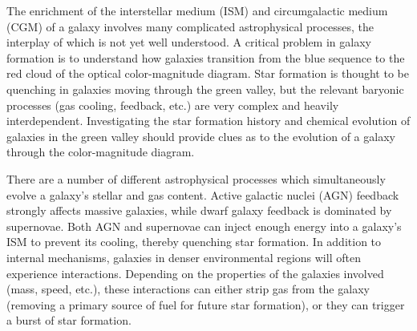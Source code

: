 The enrichment of the interstellar medium (ISM) and circumgalactic medium (CGM) 
of a galaxy involves many complicated astrophysical processes, the interplay of 
which is not yet well understood.  A critical problem in galaxy formation is to 
understand how galaxies transition from the blue sequence to the red cloud of 
the optical color-magnitude diagram.  Star formation is thought to be quenching 
in galaxies moving through the green valley, but the relevant baryonic processes 
(gas cooling, feedback, etc.) are very complex and heavily interdependent.  
Investigating the star formation history and chemical evolution of galaxies in 
the green valley should provide clues as to the evolution of a galaxy through 
the color-magnitude diagram.


There are a number of different astrophysical processes which simultaneously 
evolve a galaxy's stellar and gas content.  Active galactic nuclei (AGN) 
feedback strongly affects massive galaxies, while dwarf galaxy feedback is 
dominated by supernovae.  Both AGN and supernovae can inject enough energy into 
a galaxy's ISM to prevent its cooling, thereby quenching star formation.  In 
addition to internal mechanisms, galaxies in denser environmental regions will 
often experience interactions.  Depending on the properties of the galaxies 
involved (mass, speed, etc.), these interactions can either strip gas from the 
galaxy (removing a primary source of fuel for future star formation), or they 
can trigger a burst of star formation.

